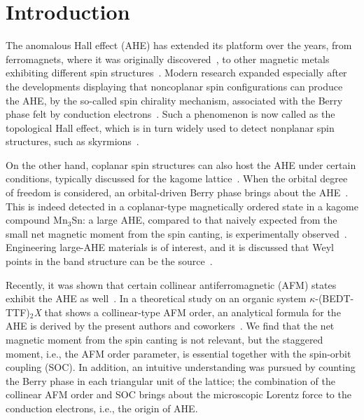 \documentclass[aps,twocolumn,prb,preprintnumbers,amsmath,amssymb]{revtex4-2}
\begin{document}


\maketitle
\narrowtext

\section{Introduction\label{sec:intro}}

The anomalous Hall effect (AHE) has extended its platform over the years, 
 from ferromagnets, where it was originally discovered~\cite{hall,karplus}, 
 to other magnetic metals exhibiting different spin structures~\cite{nagaosa,smejkal}. 
Modern research expanded especially after the developments displaying that 
 noncoplanar spin configurations can produce the AHE, 
 by the so-called spin chirality mechanism, associated with the Berry phase felt by conduction electrons~\cite{ye,ohgushi}. 
Such a phenomenon is now called as the topological Hall effect, 
 which is in turn widely used to detect nonplanar spin structures, such as skyrmions~\cite{nagaosa2}. 

On the other hand, coplanar spin structures can also host the AHE under certain conditions, 
 typically discussed for the kagome lattice~\cite{tomizawa,chen}. 
When the orbital degree of freedom is considered, an orbital-driven Berry phase brings about the AHE~\cite{tomizawa}. 
This is indeed detected in a coplanar-type magnetically ordered state in a kagome compound Mn$_3$Sn: 
 a large AHE, compared to that naively expected from the small net magnetic moment from the spin canting, 
 is experimentally observed~\cite{nakatsuji}. 
Engineering large-AHE materials is of interest, 
 and it is discussed that Weyl points in the band structure can be the source~\cite{ito,liu,ikeda,nayak,tanaka}.

Recently, it was shown that certain collinear antiferromagnetic (AFM) states exhibit the AHE as well~\cite{smejkal2, naka}. 
In a theoretical study on an organic system $\kappa$-(BEDT-TTF)$_2${\it X} that shows a collinear-type AFM order, 
 an analytical formula for the AHE is derived by the present authors and coworkers~\cite{naka}.  
We find that the net magnetic moment from the spin canting is not relevant, 
 but the staggered moment, i.e., the AFM order parameter, is essential together with the spin-orbit coupling (SOC).  
In addition, an intuitive understanding was pursued by counting the Berry phase in each triangular unit of the lattice; 
the combination of the collinear AFM order and SOC brings about 
 the microscopic Lorentz force to the conduction electrons, i.e., the origin of AHE. 
\end{document}
